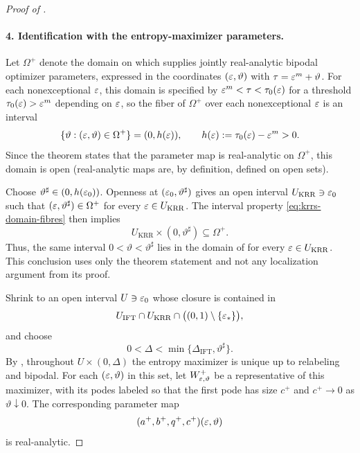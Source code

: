 \begin{proof}[Proof of ]
\paragraph{4. Identification with the entropy-maximizer parameters.}
Let \(\Omega^+\) denote the domain on which
 supplies jointly real-analytic bipodal optimizer
parameters, expressed in the coordinates \((\varepsilon,\vartheta)\) with
\(\tau=\varepsilon^m+\vartheta\).  For each nonexceptional \(\varepsilon\), this domain is
specified by
\(\varepsilon^m<\tau<\tau_0(\varepsilon)\) for a threshold \(\tau_0(\varepsilon)>\varepsilon^m\)
depending on \(\varepsilon\), so the fiber of
\(\Omega^+\) over each nonexceptional \(\varepsilon\) is an interval
\begin{equation}\label{eq:krrs-domain-fibres}
  \{\vartheta:(\varepsilon,\vartheta)\in\Omega^+\}
  =(0,h(\varepsilon)),
  \qquad
  h(\varepsilon):=\tau_0(\varepsilon)-\varepsilon^m>0.
\end{equation}
Since the theorem states that the parameter map is
real-analytic on \(\Omega^+\), this domain is open (real-analytic maps are,
by definition, defined on open sets).

Choose \(\vartheta^\sharp\in(0,h(\varepsilon_0))\).  Openness at
\((\varepsilon_0,\vartheta^\sharp)\) gives an open interval
\(U_{\mathrm{KRR}}\ni\varepsilon_0\) such that
\((\varepsilon,\vartheta^\sharp)\in\Omega^+\) for every
\(\varepsilon\in U_{\mathrm{KRR}}\).  The interval property
\eqref{eq:krrs-domain-fibres} then implies
\begin{equation}\label{eq:krrs-uniform-domain}
  U_{\mathrm{KRR}}\times(0,\vartheta^\sharp)
  \subseteq\Omega^+.
\end{equation}
Thus, the same interval \(0<\vartheta<\vartheta^\sharp\) lies in the domain of
 for every \(\varepsilon\in U_{\mathrm{KRR}}\).  This
conclusion uses only the theorem statement and not any localization argument
from its proof.

Shrink to an open interval \(U\ni\varepsilon_0\) whose closure is contained in
\[
  U_{\mathrm{IFT}}\cap U_{\mathrm{KRR}}
  \cap\bigl((0,1)\setminus\{\varepsilon_*\}\bigr),
\]
and choose
\[
  0<\Delta<\min\{\Delta_{\mathrm{IFT}},\vartheta^\sharp\}.
\]
By , throughout
\(U\times(0,\Delta)\) the entropy maximizer is unique up to relabeling and
bipodal.  For each \((\varepsilon,\vartheta)\) in this set, let
\(W^+_{\varepsilon,\vartheta}\) be a representative of this maximizer, with its
podes labeled so that the first pode has size \(c^+\) and
\(c^+\to0\) as \(\vartheta\downarrow0\).  The corresponding parameter map
\begin{equation}\label{eq:krrs-optimizer-map}
  (a^+,b^+,q^+,c^+)(\varepsilon,\vartheta)
\end{equation}
is real-analytic.


\end{proof}
